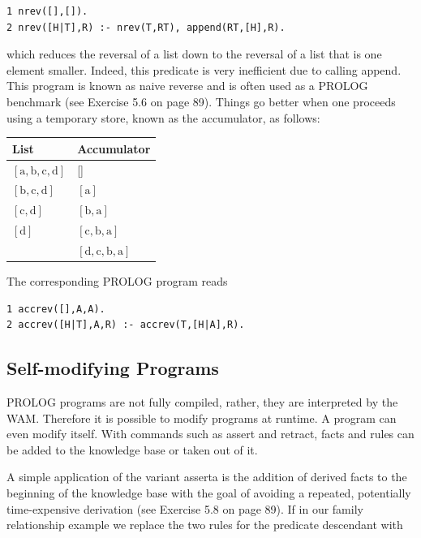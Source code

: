 \documentclass[10pt]{book}
\begin{document}
\begin{verbatim}
1 nrev([],[]).
2 nrev([H|T],R) :- nrev(T,RT), append(RT,[H],R).
\end{verbatim}

which reduces the reversal of a list down to the reversal of a list that is one element smaller. Indeed, this predicate is very inefficient due to calling append. This program is known as naive reverse and is often used as a PROLOG benchmark (see Exercise 5.6 on page 89). Things go better when one proceeds using a temporary store, known as the accumulator, as follows:

\begin{center}
\begin{tabular}{ll}
\hline
List & Accumulator \\
\hline
$[\mathrm{a}, \mathrm{b}, \mathrm{c}, \mathrm{d}]$ & [] \\
\hline
$[\mathrm{b}, \mathrm{c}, \mathrm{d}]$ & $[\mathrm{a}]$ \\
\hline
$[\mathrm{c}, \mathrm{d}]$ & $[\mathrm{b}, \mathrm{a}]$ \\
\hline
$[\mathrm{d}]$ & $[\mathrm{c}, \mathrm{b}, \mathrm{a}]$ \\
\hline
[] & $[\mathrm{d}, \mathrm{c}, \mathrm{b}, \mathrm{a}]$ \\
\hline
\end{tabular}
\end{center}

The corresponding PROLOG program reads

\begin{verbatim}
1 accrev([],A,A).
2 accrev([H|T],A,R) :- accrev(T,[H|A],R).
\end{verbatim}

\subsection{Self-modifying Programs}
PROLOG programs are not fully compiled, rather, they are interpreted by the WAM. Therefore it is possible to modify programs at runtime. A program can even modify itself. With commands such as assert and retract, facts and rules can be added to the knowledge base or taken out of it.

A simple application of the variant asserta is the addition of derived facts to the beginning of the knowledge base with the goal of avoiding a repeated, potentially time-expensive derivation (see Exercise 5.8 on page 89). If in our family relationship example we replace the two rules for the predicate descendant with
\end{document}

